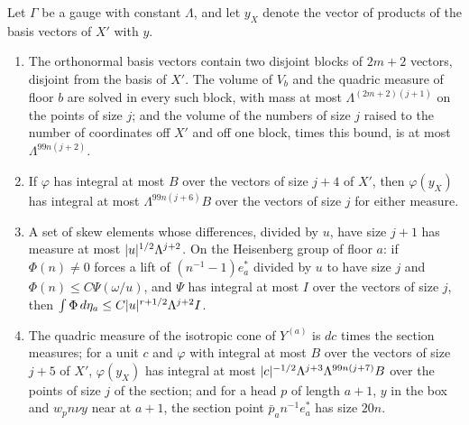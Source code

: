 \begin{lemma}\label{lem:quadric-volumes}
Let $\Gamma$ be a gauge with constant $\Lambda$, and let $y_X$ denote the vector of products of the basis vectors of $X'$ with $y$.
\begin{enumerate}[label=\textup{(\alph*)}]
\item The orthonormal basis vectors contain two disjoint blocks of $2m+2$ vectors, disjoint from the basis of $X'$. The volume of $V_b$ and the quadric measure of floor $b$ are solved in every such block, with mass at most
$\Lambda^{(2m+2)(j+1)}$ on the points of size $j$; and the volume of the numbers of size $j$ raised to the number of coordinates off $X'$ and off one block, times this bound, is at most $\Lambda^{99n(j+2)}$.
\item If $\varphi$ has integral at most $B$ over the vectors of size $j+4$ of $X'$, then $\varphi(y_X)$ has integral at most $\Lambda^{99n(j+6)}B$ over the vectors of size $j$ for either measure.
\item A set of skew elements whose differences, divided by $u$, have size $j+1$ has measure at most $\lvert u\rvert^{1/2}\Lambda^{j+2}$. On the Heisenberg group of floor $a$: if $\Phi(n)\ne0$ forces a lift of $(n^{-1}-1)e^*_a$ divided by $u$ to have size
$j$ and $\Phi(n)\le C\Psi(\omega/u)$, and $\Psi$ has integral at most $I$ over the vectors of size $j$, then $\int\Phi\,d\eta_a\le C\lvert u\rvert^{r+1/2}\Lambda^{j+2}I$.
\item The quadric measure of the isotropic cone of $Y^{(a)}$ is $dc$ times the section measures; for a unit $c$ and $\varphi$ with integral at most $B$ over the vectors of size $j+5$ of $X'$, $\varphi(y_X)$ has integral at most
$\lvert c\rvert^{-1/2}\Lambda^{j+3}\Lambda^{99n(j+7)}B$ over the points of size $j$ of the section; and for a head $p$ of length $a+1$, $y$ in the box and $w_pn\nu y$ near at $a+1$, the section point $\bar p_an^{-1}e^*_a$ has size $20n$.
\end{enumerate}
\end{lemma}

